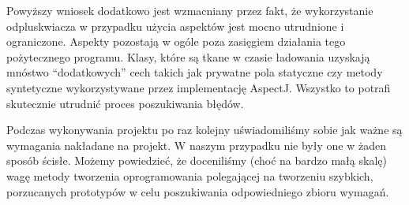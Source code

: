 \documentclass[12pt,a4paper,titlepage]{article}
\begin{document}
Powyższy wniosek dodatkowo jest wzmacniany przez fakt, że wykorzystanie odpluskwiacza w przypadku użycia aspektów jest mocno utrudnione i ograniczone. Aspekty pozostają w ogóle poza zasięgiem działania tego pożytecznego programu. Klasy, które są tkane w czasie ładowania uzyskają mnóstwo ``dodatkowych'' cech takich jak prywatne pola statyczne czy metody syntetyczne wykorzystywane przez implementację AspectJ. Wszystko to potrafi skutecznie utrudnić proces poszukiwania błędów.

Podczas wykonywania projektu po raz kolejny uświadomiliśmy sobie jak ważne są wymagania nakładane na projekt. W naszym przypadku nie były one w żaden sposób ścisłe. Możemy powiedzieć, że doceniliśmy (choć na bardzo małą skalę) wagę metody tworzenia oprogramowania polegającej na tworzeniu szybkich, porzucanych prototypów w celu poszukiwania odpowiedniego zbioru wymagań.
\end{document}
